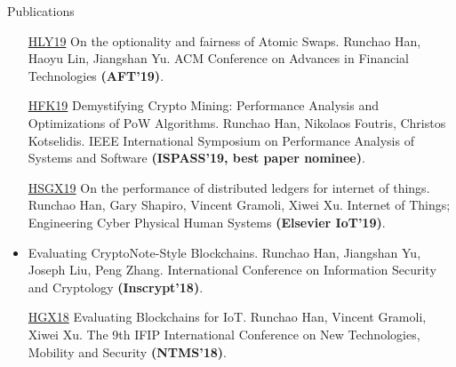 \documentclass{resume} %
\begin{document}
\begin{rSection}{Publications}
\begin{itemize}
        \item[\href{https://eprint.iacr.org/2019/896}{HLY19}] On the optionality and fairness of Atomic Swaps. Runchao Han, Haoyu Lin, Jiangshan Yu.  ACM Conference on Advances in Financial Technologies \textbf{(AFT'19)}.
        \item[\href{https://www.research.manchester.ac.uk/portal/files/85753741/paper.pdf}{HFK19}] Demystifying Crypto Mining: Performance Analysis and Optimizations of PoW Algorithms. Runchao Han, Nikolaos Foutris, Christos Kotselidis. IEEE International Symposium on Performance Analysis of Systems and Software \textbf{(ISPASS'19, best paper nominee)}.
        \item[\href{https://gramoli.redbellyblockchain.io/web/doc/pubs/IoT2019.pdf}{HSGX19}] On the performance of distributed ledgers for internet of things. Runchao Han, Gary Shapiro, Vincent Gramoli, Xiwei Xu. Internet of Things; Engineering Cyber Physical Human Systems \textbf{(Elsevier IoT'19)}.
        \item[\href{https://www.researchgate.net/profile/Runchao_Han/publication/331227984_Evaluating_CryptoNote-Style_Blockchains_14th_International_Conference_Inscrypt_2018_Fuzhou_China_December_14-17_2018_Revised_Selected_Papers/links/5c747901299bf1268d25a5f5/Evaluating-CryptoNote-Style-Blockchains-14th-International-Conference-Inscrypt-2018-Fuzhou-China-December-14-17-2018-Revised-Selected-Papers.pdf}{HYLZ18}] Evaluating CryptoNote-Style Blockchains. Runchao Han, Jiangshan Yu, Joseph Liu, Peng Zhang. International Conference on Information Security and Cryptology \textbf{(Inscrypt'18)}.
        \item[\href{https://gramoli.redbellyblockchain.io/web/doc/pubs2/blockchain-iot.pdf}{HGX18}] Evaluating Blockchains for IoT. Runchao Han, Vincent Gramoli, Xiwei Xu. The 9th IFIP International Conference on New Technologies, Mobility and Security \textbf{(NTMS'18)}.
    \end{itemize}
\end{rSection}
\end{document}
